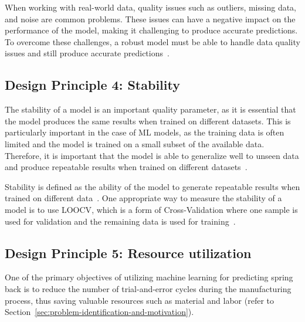 When working with real-world data, quality issues such as outliers, missing data, and
noise are common problems.
These issues can have a negative impact on the performance of the model, making it challenging to produce accurate
predictions.
To overcome these challenges, a robust model must be able to handle data quality issues and still produce
accurate predictions~\cite[p. 16]{siebert2022construction}.


\subsection*{Design Principle 4: Stability}


The stability of a model is an important quality parameter, as it is essential that
the model produces the same results when trained on different datasets.
This is particularly important in the case of \ac{ML} models, as the training data
is often limited and the model is trained on a small subset of the available data.
Therefore, it is important that the model is able to generalize well to unseen data and
produce repeatable results when trained on different
datasets~\cite[p. 16]{siebert2022construction}.

Stability is defined as the ability of the model to generate repeatable
results when trained on different data~\cite[p. 16]{siebert2022construction}.
One appropriate way to measure the stability of a model is to use \ac{LOOCV},
which is a form of Cross-Validation where one sample is used for validation and the remaining
data is used for training~\cite[p. 200--201]{gareth2013introduction}.

\subsection*{Design Principle 5: Resource utilization}\label{subsec:dp5-resource-utilization}
One of the primary objectives of utilizing machine learning for predicting spring back is to
reduce the number of trial-and-error cycles during the manufacturing process, thus saving
valuable resources such as material and labor
(refer to Section~\ref{sec:problem-identification-and-motivation}).

